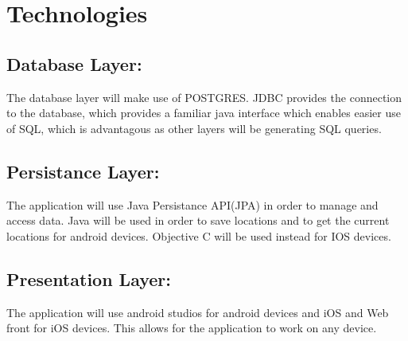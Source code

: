 \documentclass[11pt]{article}
\begin{document}
\section{Technologies}
\subsection{Database Layer:}
	The database layer will make use of POSTGRES. JDBC provides the connection to the database, which provides a familiar java interface which enables easier use of SQL, which is 	advantagous as other layers will be generating SQL queries.
\subsection{Persistance Layer:}
	The application will use Java Persistance API(JPA) in order to manage and access data.
	Java will be used in order to save locations and to get the current locations for android devices.
	Objective C will be used instead for IOS devices.
\subsection{Presentation Layer:}
	The application will use android studios for android devices and iOS and Web front for iOS devices. This allows for the 		application to work on any device.
\end{document}
